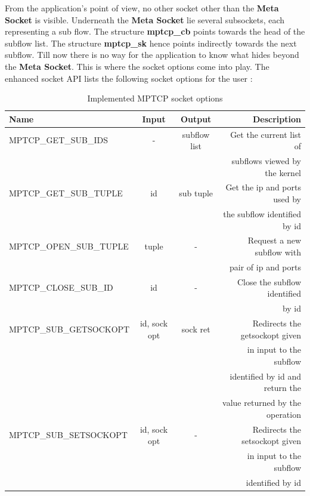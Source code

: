 \documentclass[a4paper,11pt]{article}
\begin{document}
			From the application's point of view, no other socket other than the \textbf{Meta Socket} is visible. Underneath the \textbf{Meta Socket} lie several subsockets, each representing a sub flow. The structure \textbf{mptcp\_cb} points towards the head of the subflow list. The structure \textbf{mptcp\_sk} hence points indirectly towards the next subflow.
			Till now there is no way for the application to know what hides beyond the \textbf{Meta Socket}. This is where the socket options come into play. The enhanced socket API lists the following socket options for the user \cite{api}:

			\begin{table}[h]
				
				

				\begin{tabular}{|l|c|c|r|}
					\hline
					Name & Input & Output & Description \\
					\hline
					\hline
					MPTCP\_GET\_SUB\_IDS & - & subflow list & Get the current list of \\&&&subflows viewed by the kernel \\
					\hline
					MPTCP\_GET\_SUB\_TUPLE & id & sub tuple & Get the ip and ports used by \\&&&the subflow identified by id \\
					\hline
					MPTCP\_OPEN\_SUB\_TUPLE & tuple & - & Request a new subflow with \\&&&pair of ip and ports \\
					\hline
					MPTCP\_CLOSE\_SUB\_ID & id & - & Close the subflow identified \\&&&by id \\
					\hline
					MPTCP\_SUB\_GETSOCKOPT & id, sock opt & sock ret & Redirects the getsockopt given \\&&&in input to the subflow \\&&&identified by id and return the \\&&&value returned by the operation \\
					\hline
					MPTCP\_SUB\_SETSOCKOPT & id, sock opt & - & Redirects the setsockopt given \\&&&in input to the subflow \\&&&identified by id \\
					\hline

				\end{tabular}
				\caption{Implemented MPTCP socket options}
			\end{table}
\end{document}
